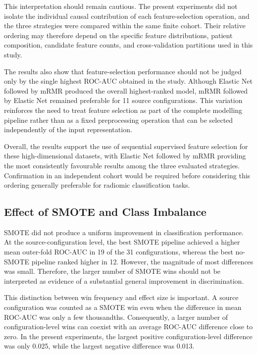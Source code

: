 \documentclass[12pt,twocolumn]{article}
\begin{document}
This interpretation should remain cautious. The present experiments
did not isolate the individual causal contribution of each
feature-selection operation, and the three strategies were compared
within the same finite cohort. Their relative ordering may therefore
depend on the specific feature distributions, patient composition,
candidate feature counts, and cross-validation partitions used in
this study.

The results also show that feature-selection performance should not be
judged only by the single highest ROC-AUC obtained in the study.
Although Elastic Net followed by mRMR produced the overall
highest-ranked model, mRMR followed by Elastic Net remained preferable
for 11 source configurations. This variation reinforces the need to
treat feature selection as part of the complete modelling pipeline
rather than as a fixed preprocessing operation that can be selected
independently of the input representation.

Overall, the results support the use of sequential supervised feature
selection for these high-dimensional datasets, with Elastic Net
followed by mRMR providing the most consistently favourable results
among the three evaluated strategies. Confirmation in an independent
cohort would be required before considering this ordering generally
preferable for radiomic classification tasks.











\subsection{Effect of SMOTE and Class Imbalance}
\label{subsec:discussion_smote}

SMOTE did not produce a uniform improvement in classification
performance. At the source-configuration level, the best SMOTE
pipeline achieved a higher mean outer-fold ROC-AUC in 19 of the 31
configurations, whereas the best no-SMOTE pipeline ranked higher in
12. However, the magnitude of most differences was small. Therefore,
the larger number of SMOTE wins should not be interpreted as evidence
of a substantial general improvement in discrimination.

This distinction between win frequency and effect size is important.
A source configuration was counted as a SMOTE win even when the
difference in mean ROC-AUC was only a few thousandths. Consequently,
a larger number of configuration-level wins can coexist with an
average ROC-AUC difference close to zero. In the present experiments,
the largest positive configuration-level difference was only 0.025,
while the largest negative difference was 0.013.
\end{document}
